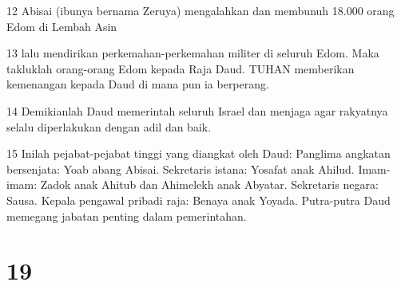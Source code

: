 \par 12 Abisai (ibunya bernama Zeruya) mengalahkan dan membunuh 18.000 orang Edom di Lembah Asin
\par 13 lalu mendirikan perkemahan-perkemahan militer di seluruh Edom. Maka takluklah orang-orang Edom kepada Raja Daud. TUHAN memberikan kemenangan kepada Daud di mana pun ia berperang.
\par 14 Demikianlah Daud memerintah seluruh Israel dan menjaga agar rakyatnya selalu diperlakukan dengan adil dan baik.
\par 15 Inilah pejabat-pejabat tinggi yang diangkat oleh Daud: Panglima angkatan bersenjata: Yoab abang Abisai. Sekretaris istana: Yosafat anak Ahilud. Imam-imam: Zadok anak Ahitub dan Ahimelekh anak Abyatar. Sekretaris negara: Sausa. Kepala pengawal pribadi raja: Benaya anak Yoyada. Putra-putra Daud memegang jabatan penting dalam pemerintahan.

\chapter{19}

